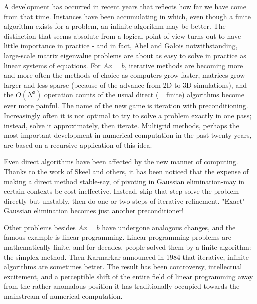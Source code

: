 A development has occurred in recent years that reflects how far we have come from that time. Instances have been accumulating in which, even though a finite algorithm exists for a problem, an infinite algorithm may be better. The distinction that seems absolute from a logical point of view turns out to have little importance in practice - and in fact, Abel and Galois notwithstanding, large-scale matrix eigenvalue problems are about as easy to solve in practice as linear systems of equations. For $A x=b$, iterative methods are becoming more and more often the methods of choice as computers grow faster, matrices grow larger and less sparse (because of the advance from 2D to 3D simulations), and the $O\left(N^3\right)$ operation counts of the usual direct (= finite) algorithms become ever more painful. The name of the new game is iteration with preconditioning. Increasingly often it is not optimal to try to solve a problem exactly in one pass; instead, solve it approximately, then iterate. Multigrid methods, perhaps the most important development in numerical computation in the past twenty years, are based on a recursive application of this idea.

Even direct algorithms have been affected by the new manner of computing. Thanks to the work of Skeel and others, it has been noticed that the expense of making a direct method stable-say, of pivoting in Gaussian elimination-may in certain contexts be cost-ineffective. Instead, skip that step-solve the problem directly but unstably, then do one or two steps of iterative refinement. "Exact" Gaussian elimination becomes just another preconditioner!

Other problems besides $A x=b$ have undergone analogous changes, and the famous example is linear programming. Linear programming problems are mathematically finite, and for decades, people solved them by a finite algorithm: the simplex method. Then Karmarkar announced in 1984 that iterative, infinite algorithms are sometimes better. The result has been controversy, intellectual excitement, and a perceptible shift of the entire field of linear programming away from the rather anomalous position it has traditionally occupied towards the mainstream of numerical computation.

